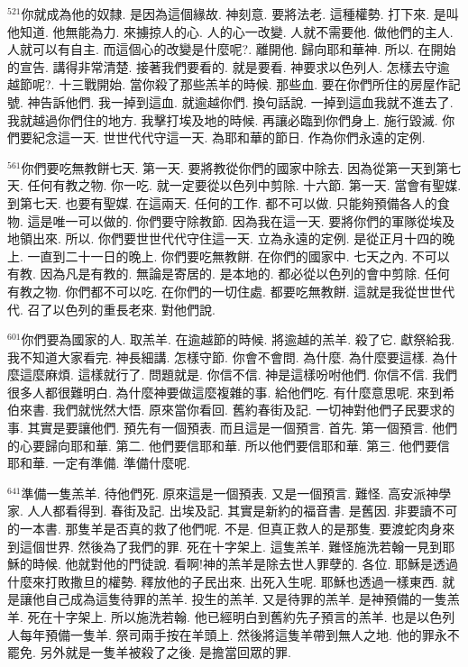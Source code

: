 \documentclass{book}
\begin{document}
$^{521}$你就成為他的奴隸.
是因為這個緣故.
神刻意.
要將法老.
這種權勢.
打下來.
是叫他知道.
他無能為力.
來擄掠人的心.
人的心一改變.
人就不需要他.
做他們的主人.
人就可以有自主.
而這個心的改變是什麼呢?.
離開他.
歸向耶和華神.
所以.
在開始的宣告.
講得非常清楚.
接著我們要看的.
就是要看.
神要求以色列人.
怎樣去守逾越節呢?.
十三戰開始.
當你殺了那些羔羊的時候.
那些血.
要在你們所住的房屋作記號.
神告訴他們.
我一掉到這血.
就逾越你們.
換句話說.
一掉到這血我就不進去了.
我就越過你們住的地方.
我擊打埃及地的時候.
再讓必臨到你們身上.
施行毀滅.
你們要紀念這一天.
世世代代守這一天.
為耶和華的節日.
作為你們永遠的定例.

$^{561}$你們要吃無教餅七天.
第一天.
要將教從你們的國家中除去.
因為從第一天到第七天.
任何有教之物.
你一吃.
就一定要從以色列中剪除.
十六節.
第一天.
當會有聖媒.
到第七天.
也要有聖媒.
在這兩天.
任何的工作.
都不可以做.
只能夠預備各人的食物.
這是唯一可以做的.
你們要守除教節.
因為我在這一天.
要將你們的軍隊從埃及地領出來.
所以.
你們要世世代代守住這一天.
立為永遠的定例.
是從正月十四的晚上.
一直到二十一日的晚上.
你們要吃無教餅.
在你們的國家中.
七天之內.
不可以有教.
因為凡是有教的.
無論是寄居的.
是本地的.
都必從以色列的會中剪除.
任何有教之物.
你們都不可以吃.
在你們的一切住處.
都要吃無教餅.
這就是我從世世代代.
召了以色列的重長老來.
對他們說.

$^{601}$你們要為國家的人.
取羔羊.
在逾越節的時候.
將逾越的羔羊.
殺了它.
獻祭給我.
我不知道大家看完.
神長細講.
怎樣守節.
你會不會問.
為什麼.
為什麼要這樣.
為什麼這麼麻煩.
這樣就行了.
問題就是.
你信不信.
神是這樣吩咐他們.
你信不信.
我們很多人都很難明白.
為什麼神要做這麼複雜的事.
給他們吃.
有什麼意思呢.
來到希伯來書.
我們就恍然大悟.
原來當你看回.
舊約春街及記.
一切神對他們子民要求的事.
其實是要讓他們.
預先有一個預表.
而且這是一個預言.
首先.
第一個預言.
他們的心要歸向耶和華.
第二.
他們要信耶和華.
所以他們要信耶和華.
第三.
他們要信耶和華.
一定有準備.
準備什麼呢.

$^{641}$準備一隻羔羊.
待他們死.
原來這是一個預表.
又是一個預言.
難怪.
高安派神學家.
人人都看得到.
春街及記.
出埃及記.
其實是新約的福音書.
是舊因.
非要讀不可的一本書.
那隻羊是否真的救了他們呢.
不是.
但真正救人的是那隻.
要渡蛇肉身來到這個世界.
然後為了我們的罪.
死在十字架上.
這隻羔羊.
難怪施洗若翰一見到耶穌的時候.
他就對他的門徒說.
看啊!神的羔羊是除去世人罪孽的.
各位.
耶穌是透過什麼來打敗撒旦的權勢.
釋放他的子民出來.
出死入生呢.
耶穌也透過一樣東西.
就是讓他自己成為這隻待罪的羔羊.
投生的羔羊.
又是待罪的羔羊.
是神預備的一隻羔羊.
死在十字架上.
所以施洗若翰.
他已經明白到舊約先子預言的羔羊.
也是以色列人每年預備一隻羊.
祭司兩手按在羊頭上.
然後將這隻羊帶到無人之地.
他的罪永不罷免.
另外就是一隻羊被殺了之後.
是擔當回眾的罪.
\end{document}
